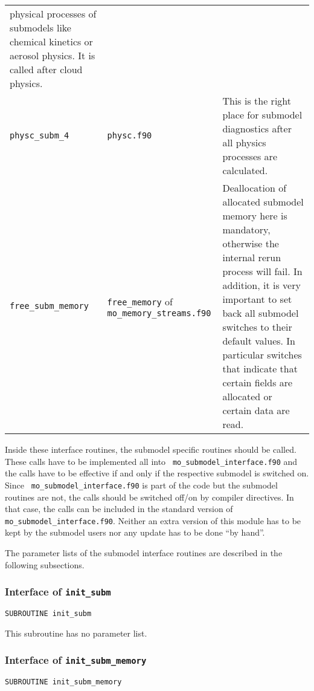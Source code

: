 \begin{longtable}{l@{\extracolsep\fill}p{4cm}p{7.0cm}}
physical processes of submodels like chemical kinetics or aerosol
physics. It is called after cloud physics. \\
{\tt physc\_subm\_4} & {\tt physc.f90} & This is the right place for
submodel diagnostics after all physics processes are calculated.\\
{\tt free\_subm\_memory} & {\tt free\_memory} of {\tt
  mo\_memory\_streams.f90} & Deallocation of allocated submodel memory
here is mandatory, otherwise the internal rerun process will fail. In
addition, it is very important to set back all submodel switches to
their default values. In particular switches that indicate that
certain fields are allocated or certain data are read.\\
\end{longtable}

Inside these interface routines, the submodel specific routines should
be called. These calls have to be implemented all into {\tt
  mo\_submodel\_interface.f90} and the calls have to be effective if
and only if the respective submodel is switched on. Since {\tt
  mo\_submodel\_interface.f90} is part of the \echam{} code but the
submodel routines are not, the calls should be switched off/on by
compiler directives. In that case, the calls can be included in the
standard version of {\tt
  mo\_submodel\_interface.f90}. Neither an extra version of this module has
to be kept by the submodel users nor any update has to be done ``by
hand''. 

The parameter lists of the submodel interface routines are described
in the following subsections.

\subsubsection{Interface of {\tt init\_subm}}

\begin{lstlisting}[caption=init\_subm]
SUBROUTINE init_subm
\end{lstlisting}

This subroutine has no parameter list.\vspace{1cm}

\subsubsection{Interface of {\tt init\_subm\_memory}}

\begin{lstlisting}[caption=init\_subm\_memory]
SUBROUTINE init_subm_memory
\end{lstlisting}

